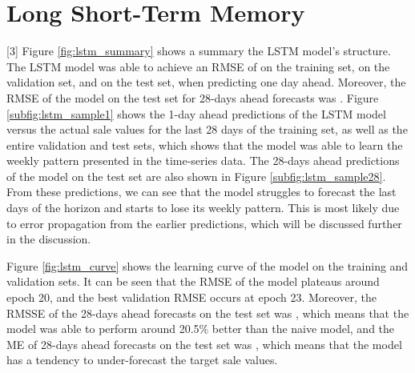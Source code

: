 \section{Long Short-Term Memory}
[3]
Figure \ref{fig:lstm_summary} shows a summary the LSTM model's structure. 
The LSTM model was able to achieve an RMSE of \lstmTrnRMSE{} on the training set, \lstmValRMSE{} on the validation set, and \lstmTstRMSE{} on the test set, when predicting one day ahead. 
Moreover, the RMSE of the model on the test set for 28-days ahead forecasts was \lstmTstMonRMSE{}.
Figure \ref{subfig:lstm_sample1} shows the 1-day ahead predictions of the LSTM model versus the actual sale values for the last 28 days of the training set, as well as the entire validation and test sets, which shows that the model was able to learn the weekly pattern presented in the time-series data.
The 28-days ahead predictions of the model on the test set are also shown in Figure \ref{subfig:lstm_sample28}.
From these predictions, we can see that the model struggles to forecast the last days of the horizon and starts to lose its weekly pattern.
This is most likely due to error propagation from the earlier predictions, which will be discussed further in the discussion.

Figure \ref{fig:lstm_curve} shows the learning curve of the model on the training and validation sets. 
It can be seen that the RMSE of the model plateaus around epoch 20, and the best validation RMSE occurs at epoch 23.
Moreover, the RMSSE of the 28-days ahead forecasts on the test set was \lstmTstMonRMSSE{}, which means that the model was able to perform around 20.5\% better than the naive model, and the ME of 28-days ahead forecasts on the test set was \lstmTstMonME{}, which means that the model has a tendency to under-forecast the target sale values. 

